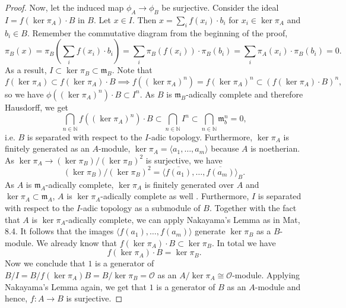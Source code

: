 \documentclass{article}
\theoremstyle{plain}%
\theoremstyle{definition}
\theoremstyle{remark}
\begin{document}
\begin{proof}
    Now, let the induced map \(\phi_A \to \phi_B\) be surjective. 
    Consider the ideal \(I = f(\ker \pi_A) \cdot B\) in \(B\).
    Let \(x \in I\). Then \(x = \sum_i f(x_i) \cdot b_i\) for \(x_i \in \ker \pi_A\) and \(b_i \in B\).
    Remember the commutative diagram from the beginning of the proof,
    \[
        \pi_B(x) = \pi_B\left(\sum_i f(x_i)\cdot b_i\right) 
        = \sum_i \pi_B(f(x_i))\cdot \pi_B(b_i) 
        = \sum_i\pi_A(x_i)\cdot \pi_B(b_i) = 0. 
    \]
    As a result, \(I \subset \ker \pi_B \subset \mathfrak{m}_B\).
    Note that
    \[
        f(\ker \pi_A) \subset f(\ker \pi_A)\cdot B \implies f((\ker \pi_A)^n) 
        = f(\ker \pi_A)^n \subset (f(\ker \pi_A)\cdot B)^n,
    \]
    so we have \(\phi((\ker \pi_A)^n)\cdot B \subset I^n\).
    As \(B\) is \(\mathfrak{m}_B\)-adically complete and therefore Hausdorff, we get
    \[
        \bigcap_{n \in \mathbb N} f((\ker \pi_A)^n) \cdot B \subset \bigcap_{n \in \mathbb N} I^n 
        \subset \bigcap_{n \in \mathbb N} \mathfrak{m}_b^n = 0,
    \]
    i.e. \(\!B\) is separated with respect to the \(I\)-adic topology.
    Furthermore, \(\ker \pi_A\) is finitely generated as an \(A\)-module, 
    \(\ker \pi_A = \langle a_1, \dots, a_m\rangle\) because \(A\) is noetherian. 
    As \(\ker \pi_A \to (\ker \pi_B)/(\ker \pi_B)^2\) is surjective, we have 
    \[(\ker \pi_B)/(\ker \pi_B)^2 = \langle \overline{f(a_1)}, \dots, \overline{f(a_m)}\rangle_B.\]
    As \(A\) is \(\mathfrak{m}_A\)-adically complete, \(\ker \pi_A\) is finitely generated over \(A\)
    and \(\ker \pi_A \subset \mathfrak{m}_A\), \(A\) is \(\ker \pi_A\)-adically complete as well
    \cite[cf.][\href{https://stacks.math.columbia.edu/tag/090T}{lemma 10.96.8}]{stacks-project}.
    Furthermore, \(I\) is separated with respect to the \(I\)-adic topology 
    as a submodule of \(B\). Together with the fact that \(A\) is \(\ker \pi_A\)-adically complete,
    we can apply Nakayama's Lemma as in Mat, 8.4. 
    It follows that the images \(\langle f(a_1), \dots, f(a_m)\rangle\) generate \(\ker \pi_B\)
    as a \(B\)-module. We already know that \(f(\ker \pi_A) \cdot B \subset \ker \pi_B\). 
    In total we have
    \[
        f(\ker \pi_A) \cdot B = \ker \pi_B.
    \]
    Now we conclude that \(1\) is a generator of \(B/I = B/f(\ker \pi_A) B = B/\ker \pi_B = \mathcal{O}\) as an 
    \(A/\ker \pi_A \cong \mathcal{O}\)-module.
    Applying Nakayama's Lemma again, we get that \(1\) is a generator of \(B\) as an \(A\)-module 
    and hence, \(f\colon A \to B\) is surjective.
\end{proof}
\end{document}
